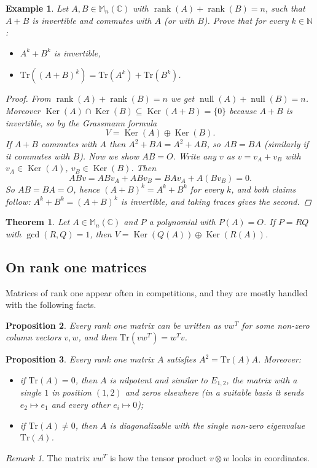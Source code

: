 \documentclass[12pt]{article}
\renewcommand{\Tr}{\mathrm{Tr}}
\DeclareMathOperator{\Rank}{rank}
\DeclareMathOperator{\Null}{null}
\DeclareMathOperator{\Ker}{Ker}
\theoremstyle{breakplain}
\newtheorem{theorem}{Theorem}[section]
\newtheorem{prop}[theorem]{Proposition}
\theoremstyle{breakdef}
\newtheorem*{example}{Example}
\theoremstyle{remark}
\newtheorem*{remark}{Remark}
\begin{document}
\begin{example}
    Let $A,B\in \mathbb{M}_n(\mathbb{C})$ with $\Rank(A)+\Rank(B)=n$, such that $A+B$ is invertible and commutes with $A$ (or with $B$). Prove that for every $k\in \mathbb{N}$:
    \begin{itemize}
        \item $A^k+B^k$ is invertible,
        \item $\Tr((A+B)^k)=\Tr(A^k)+\Tr(B^k)$.
    \end{itemize}
    \begin{proof}
        From $\Rank(A)+\Rank(B)=n$ we get $\Null(A)+\Null(B)=n$. Moreover $\Ker(A)\cap \Ker(B)\subseteq\Ker(A+B)=\{ 0\}$ because $A+B$ is invertible, so by the Grassmann formula
        \[V=\Ker(A) \oplus \Ker(B).\]
        If $A+B$ commutes with $A$ then $A^2+BA=A^2+AB$, so $AB=BA$ (similarly if it commutes with $B$). Now we show $AB=O$. Write any $v$ as $v=v_A+v_B$ with $v_A\in\Ker(A)$, $v_B\in\Ker(B)$. Then
        \[ABv=ABv_A+ABv_B=BAv_A+A(Bv_B)=0.\]
        So $AB=BA=O$, hence $(A+B)^k=A^k+B^k$ for every $k$, and both claims follow: $A^k+B^k=(A+B)^k$ is invertible, and taking traces gives the second.
    \end{proof}
\end{example}
\begin{theorem}
    Let $A\in \mathbb{M}_n(\mathbb{C})$ and $P$ a polynomial with $P(A)=O$. If $P=RQ$ with $\gcd(R,Q)=1$, then $V=\Ker(Q(A)) \oplus \Ker(R(A))$.
\end{theorem}

\newpage
\subsection{On rank one matrices}
Matrices of rank one appear often in competitions, and they are mostly handled with the following facts.
\begin{prop}
    Every rank one matrix can be written as $vw^T$ for some non-zero column vectors $v,w$, and then $\Tr(vw^T)=w^Tv$.
\end{prop}
\begin{prop}
    Every rank one matrix $A$ satisfies $A^2=\Tr(A) A$. Moreover:
    \begin{itemize}
        \item if $\Tr(A)=0$, then $A$ is nilpotent and similar to $E_{1,2}$, the matrix with a single $1$ in position $(1,2)$ and zeros elsewhere (in a suitable basis it sends $e_2\mapsto e_1$ and every other $e_i\mapsto 0$);
        \item if $\Tr(A)\neq0$, then $A$ is diagonalizable with the single non-zero eigenvalue $\Tr(A)$.
    \end{itemize}
\end{prop}
\begin{remark}
    The matrix $vw^T$ is how the tensor product $v\otimes w$ looks in coordinates.
\end{remark}
\end{document}
